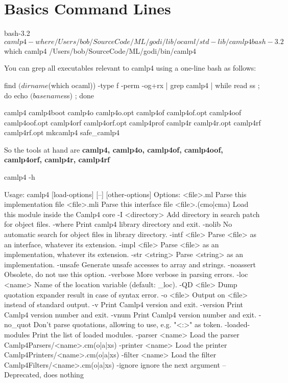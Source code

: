 \documentclass[svgnames,12pt,a4paper]{report}
\begin{document}
\section{Basics Command Lines}


\begin{alternate}
bash-3.2$ camlp4 -where
/Users/bob/SourceCode/ML/godi/lib/ocaml/std-lib/camlp4
bash-3.2$ which camlp4
/Users/bob/SourceCode/ML/godi/bin/camlp4
\end{alternate}


You can grep all executables relevant to camlp4 using a one-line bash
as follows:
\begin{bluetext}
find $(dirname $(which ocaml)) -type f -perm -og+rx | grep camlp4 |
while read ss ; do echo $(basename $ss) ; done
\end{bluetext}

\begin{bluetext}  
camlp4
camlp4boot
camlp4o
camlp4o.opt
camlp4of
camlp4of.opt
camlp4oof
camlp4oof.opt
camlp4orf
camlp4orf.opt
camlp4prof
camlp4r
camlp4r.opt
camlp4rf
camlp4rf.opt
mkcamlp4
safe_camlp4
\end{bluetext}

So the tools at hand are \textbf{camlp4, camlp4o, camlp4of, camlp4oof,
  camlp4orf, camlp4r, camlp4rf }

\begin{bluetext}
camlp4 -h

Usage: camlp4 [load-options] [--] [other-options]
Options:
<file>.ml        Parse this implementation file
<file>.mli       Parse this interface file
<file>.(cmo|cma) Load this module inside the Camlp4 core
  -I <directory>   Add directory in search patch for object files.
  -where           Print camlp4 library directory and exit.
  -nolib           No automatic search for object files in library directory.
  -intf <file>     Parse <file> as an interface, whatever its extension.
  -impl <file>     Parse <file> as an implementation, whatever its extension.
  -str <string>    Parse <string> as an implementation.
  -unsafe          Generate unsafe accesses to array and strings.
  -noassert        Obsolete, do not use this option.
  -verbose         More verbose in parsing errors.
  -loc <name>      Name of the location variable (default: _loc).
  -QD <file>       Dump quotation expander result in case of syntax error.
  -o <file>        Output on <file> instead of standard output.
  -v               Print Camlp4 version and exit.
  -version         Print Camlp4 version number and exit.
  -vnum            Print Camlp4 version number and exit.
  -no_quot         Don't parse quotations, allowing to use, e.g. "<:>" as token.
  -loaded-modules  Print the list of loaded modules.
  -parser <name>   Load the parser Camlp4Parsers/<name>.cm(o|a|xs)
  -printer <name>  Load the printer Camlp4Printers/<name>.cm(o|a|xs)
  -filter <name>   Load the filter Camlp4Filters/<name>.cm(o|a|xs)
  -ignore          ignore the next argument
  --               Deprecated, does nothing    
\end{bluetext}
\end{document}
